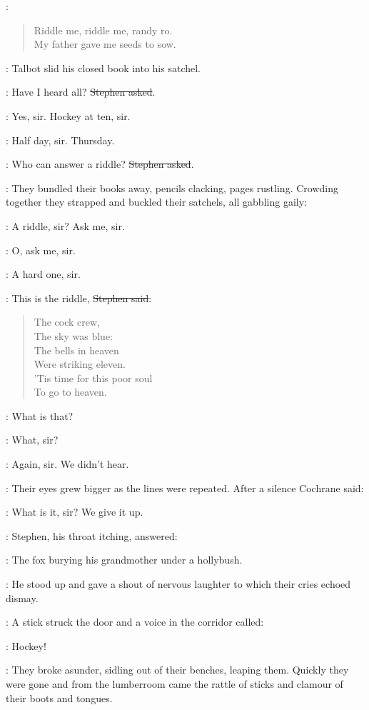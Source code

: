 \StephenInt:
\begin{verse}
    Riddle me, riddle me, randy ro. \\
    My father gave me seeds to sow.
\end{verse}

:
Talbot slid his closed book into his satchel.

\Stephen:
Have I heard all?
\sout{Stephen asked}.

\talbot:
Yes, sir. Hockey at ten, sir.

\armstrong:
Half day, sir.
Thursday.

\Stephen:
Who can answer a riddle?
\sout{Stephen asked}.

:
They bundled their books away, pencils clacking, pages rustling.
Crowding together they strapped and buckled their satchels, all gabbling gaily:

\comyn:
A riddle, sir?
Ask me, sir.

\armstrong:
O, ask me, sir.

\cochrane:
A hard one, sir.

\begin{samepage}
\Stephen:
This is the riddle,
\sout{Stephen said}:

\begin{verse}
    The cock crew, \\
    The sky was blue: \\
    The bells in heaven \\
    Were striking eleven. \\
    'Tis time for this poor soul \\
    To go to heaven.
\end{verse}
\end{samepage}

\Stephen:
What is that?

\comyn:
What, sir?

\armstrong:
Again, sir.
We didn't hear.

:
Their eyes grew bigger as the lines were repeated.
After a silence Cochrane said:

\cochrane:
What is it, sir?
We give it up.

:
Stephen, his throat itching, answered:

\Stephen:
The fox burying his grandmother under a hollybush.

:
He stood up and gave a shout of nervous laughter
to which their cries echoed dismay.

:
A stick struck the door and a voice in the corridor called:

\deasy:
Hockey!

:
They broke asunder,
sidling out of their benches, leaping them.
Quickly they were gone
and from the lumberroom came the rattle of sticks
and clamour of their boots and tongues.
